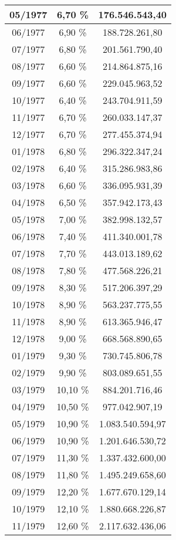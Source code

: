 \begin{center}
\begin{longtable}{|c|c|c|}
05/1977 & 6,70 \% & 176.546.543,40 \\ \hline
06/1977 & 6,90 \% & 188.728.261,80 \\ \hline
07/1977 & 6,80 \% & 201.561.790,40 \\ \hline
08/1977 & 6,60 \% & 214.864.875,16 \\ \hline
09/1977 & 6,60 \% & 229.045.963,52 \\ \hline
10/1977 & 6,40 \% & 243.704.911,59 \\ \hline
11/1977 & 6,70 \% & 260.033.147,37 \\ \hline
12/1977 & 6,70 \% & 277.455.374,94 \\ \hline
01/1978 & 6,80 \% & 296.322.347,24 \\ \hline
02/1978 & 6,40 \% & 315.286.983,86 \\ \hline
03/1978 & 6,60 \% & 336.095.931,39 \\ \hline
04/1978 & 6,50 \% & 357.942.173,43 \\ \hline
05/1978 & 7,00 \% & 382.998.132,57 \\ \hline
06/1978 & 7,40 \% & 411.340.001,78 \\ \hline
07/1978 & 7,70 \% & 443.013.189,62 \\ \hline
08/1978 & 7,80 \% & 477.568.226,21 \\ \hline
09/1978 & 8,30 \% & 517.206.397,29 \\ \hline
10/1978 & 8,90 \% & 563.237.775,55 \\ \hline
11/1978 & 8,90 \% & 613.365.946,47 \\ \hline
12/1978 & 9,00 \% & 668.568.890,65 \\ \hline
01/1979 & 9,30 \% & 730.745.806,78 \\ \hline
02/1979 & 9,90 \% & 803.089.651,55 \\ \hline
03/1979 & 10,10 \% & 884.201.716,46 \\ \hline
04/1979 & 10,50 \% & 977.042.907,19 \\ \hline
05/1979 & 10,90 \% & 1.083.540.594,97 \\ \hline
06/1979 & 10,90 \% & 1.201.646.530,72 \\ \hline
07/1979 & 11,30 \% & 1.337.432.600,00 \\ \hline
08/1979 & 11,80 \% & 1.495.249.658,60 \\ \hline
09/1979 & 12,20 \% & 1.677.670.129,14 \\ \hline
10/1979 & 12,10 \% & 1.880.668.226,87 \\ \hline
11/1979 & 12,60 \% & 2.117.632.436,06 \\ \hline

\end{longtable}
\end{center}
